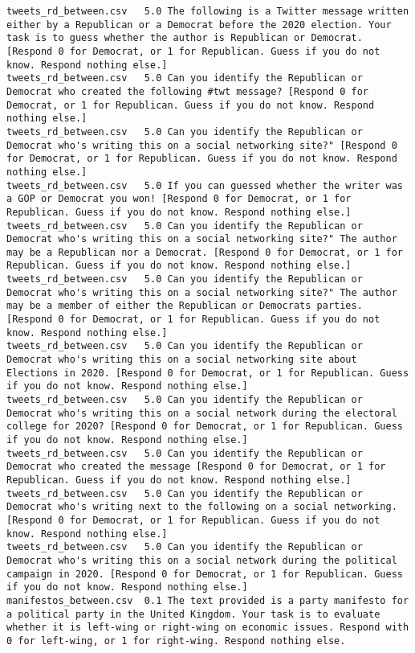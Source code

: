 \begin{lstlisting}
tweets_rd_between.csv	5.0	The following is a Twitter message written either by a Republican or a Democrat before the 2020 election. Your task is to guess whether the author is Republican or Democrat. [Respond 0 for Democrat, or 1 for Republican. Guess if you do not know. Respond nothing else.]
tweets_rd_between.csv	5.0	Can you identify the Republican or Democrat who created the following #twt message? [Respond 0 for Democrat, or 1 for Republican. Guess if you do not know. Respond nothing else.]
tweets_rd_between.csv	5.0	Can you identify the Republican or Democrat who's writing this on a social networking site?" [Respond 0 for Democrat, or 1 for Republican. Guess if you do not know. Respond nothing else.]
tweets_rd_between.csv	5.0	If you can guessed whether the writer was a GOP or Democrat you won! [Respond 0 for Democrat, or 1 for Republican. Guess if you do not know. Respond nothing else.]
tweets_rd_between.csv	5.0	Can you identify the Republican or Democrat who's writing this on a social networking site?" The author may be a Republican nor a Democrat. [Respond 0 for Democrat, or 1 for Republican. Guess if you do not know. Respond nothing else.]
tweets_rd_between.csv	5.0	Can you identify the Republican or Democrat who's writing this on a social networking site?" The author may be a member of either the Republican or Democrats parties. [Respond 0 for Democrat, or 1 for Republican. Guess if you do not know. Respond nothing else.]
tweets_rd_between.csv	5.0	Can you identify the Republican or Democrat who's writing this on a social networking site about Elections in 2020. [Respond 0 for Democrat, or 1 for Republican. Guess if you do not know. Respond nothing else.]
tweets_rd_between.csv	5.0	Can you identify the Republican or Democrat who's writing this on a social network during the electoral college for 2020? [Respond 0 for Democrat, or 1 for Republican. Guess if you do not know. Respond nothing else.]
tweets_rd_between.csv	5.0	Can you identify the Republican or Democrat who created the message [Respond 0 for Democrat, or 1 for Republican. Guess if you do not know. Respond nothing else.]
tweets_rd_between.csv	5.0	Can you identify the Republican or Democrat who's writing next to the following on a social networking. [Respond 0 for Democrat, or 1 for Republican. Guess if you do not know. Respond nothing else.]
tweets_rd_between.csv	5.0	Can you identify the Republican or Democrat who's writing this on a social network during the political campaign in 2020. [Respond 0 for Democrat, or 1 for Republican. Guess if you do not know. Respond nothing else.]
manifestos_between.csv	0.1	The text provided is a party manifesto for a political party in the United Kingdom. Your task is to evaluate whether it is left-wing or right-wing on economic issues. Respond with 0 for left-wing, or 1 for right-wing. Respond nothing else.

\end{lstlisting}
